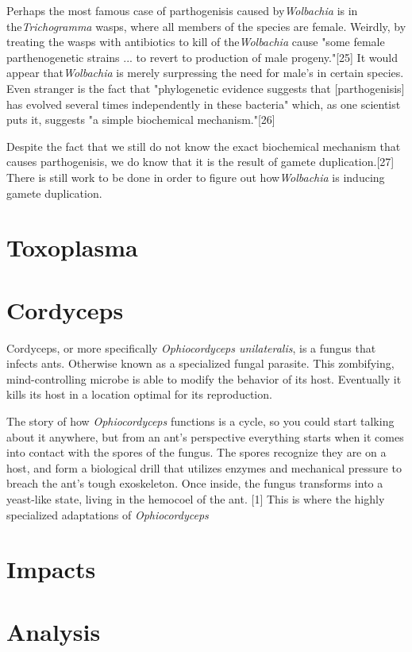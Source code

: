 \documentclass[twocolumn]{article}
\begin{document}
Perhaps the most famous case of parthogenisis caused by\textit{Wolbachia} is in the\textit{Trichogramma} wasps, where all members of the species are female. Weirdly, by treating the wasps with antibiotics to kill of the\textit{Wolbachia} cause "some female parthenogenetic strains ... to revert to production of male progeny."[25] It would appear that\textit{Wolbachia} is merely surpressing the need for male's in certain species. Even stranger is the fact that "phylogenetic evidence suggests that [parthogenisis] has evolved several times independently in these bacteria" which, as one scientist puts it, suggests "a simple biochemical mechanism."[26]  

Despite the fact that we still do not know the exact biochemical mechanism that causes parthogenisis, we do know that it is the result of gamete duplication.[27] There is still work to be done in order to figure out how\textit{Wolbachia} is inducing gamete duplication.

\section*{Toxoplasma}

\section*{Cordyceps}
Cordyceps, or more specifically \textit{Ophiocordyceps unilateralis}, is a fungus that infects ants. Otherwise known as a specialized fungal parasite. This zombifying, mind-controlling microbe is able to modify the behavior of its host. Eventually it kills its host in a location optimal for its reproduction. 

The story of how \textit{Ophiocordyceps} functions is a cycle, so you could start talking about it anywhere, but from an ant’s perspective everything starts when it comes into contact with the spores of the fungus. The spores recognize they are on a host, and form a biological drill that utilizes enzymes and mechanical pressure to breach the ant’s tough exoskeleton. Once inside, the fungus transforms into a yeast-like state, living in the hemocoel of the ant. [1] This is where the highly specialized adaptations of \textit{Ophiocordyceps} 


\section*{Impacts}

\section*{Analysis}
\end{document}
